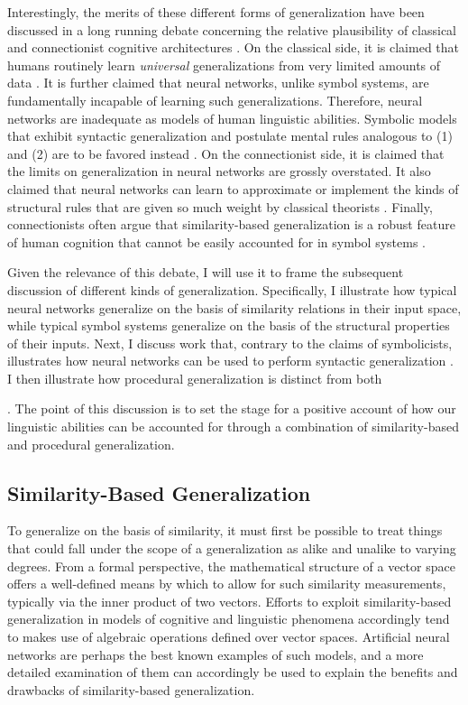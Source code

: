 Interestingly, the merits of these different forms of generalization have been discussed in a long running debate concerning the relative plausibility of classical and connectionist cognitive architectures \citep{FodorPylyshyn:1988,SmolenskyLegendre:2006}. On the classical side, it is claimed that humans routinely learn \textit{universal} generalizations from very limited amounts of data \citep{Hadley:2009,Marcus:1998}. It is further claimed that neural networks, unlike symbol systems, are fundamentally incapable of learning such generalizations. Therefore, neural networks are inadequate as models of human linguistic abilities. Symbolic models that exhibit syntactic generalization and postulate mental rules analogous to (1) and (2) are to be favored instead \citep{FodorPylyshyn:1988}. On the connectionist side, it is claimed that the limits on generalization in neural networks are grossly overstated. It also claimed that neural networks can learn to approximate or implement the kinds of structural rules that are given so much weight by classical theorists \citep{Plate:2003,SmolenskyLegendre:2006,Eliasmith:2013,Rasmussen:2011}. Finally, connectionists often argue that similarity-based generalization is a robust feature of human cognition that cannot be easily accounted for in symbol systems \citep{McClelland:2010}. 

Given the relevance of this debate, I will use it to frame the subsequent discussion of different kinds of generalization. Specifically, I illustrate how typical neural networks generalize on the basis of similarity relations in their input space, while typical symbol systems generalize on the basis of the structural properties of their inputs. Next, I discuss work that, contrary to the claims of symbolicists, illustrates how neural networks can be used to perform syntactic generalization \citep{Eliasmith:2013,Rasmussen:2011}. I then illustrate how procedural generalization is distinct from both 

. The point of this discussion is to set the stage for a positive account of how our linguistic abilities can be accounted for through a combination of similarity-based and procedural generalization. 

\subsection{Similarity-Based Generalization}

To generalize on the basis of similarity, it must first be possible to treat things that could fall under the scope of a generalization as alike and unalike to varying degrees. From a formal perspective, the mathematical structure of a vector space offers a well-defined means by which to allow for such similarity measurements, typically via the inner product of two vectors. Efforts to exploit similarity-based generalization in models of cognitive and linguistic phenomena accordingly tend to makes use of algebraic operations defined over vector spaces. Artificial neural networks are perhaps the best known examples of such models, and a more detailed examination of them can accordingly be used to explain the benefits and drawbacks of similarity-based generalization.

